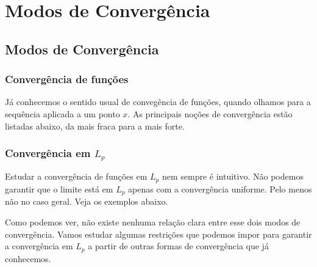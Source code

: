 







\chapter{Modos de Convergência}

\section{Modos de Convergência}

\subsection{Convergência de funções}

Já conhecemos o sentido usual de convegência de funções, quando olhamos para a sequência aplicada a um ponto $x$. As principais noções de convergência estão listadas abaixo, da mais fraca para a mais forte.

\aeConvergence
\pointwiseConvergence
\uniformConvergence

\subsection{Convergência em \texorpdfstring{$L_p$}{Lp}}

\LpConvergence

Estudar a convergência de funções em $L_p$ nem sempre é intuitivo. Não podemos garantir que o limite está em $L_p$ apenas com a convergência uniforme. Pelo menos não no caso geral. Veja os exemplos abaixo.

\counterExampleUniformConvergence

\counterExamplePointwiseConvergence

\counterExampleAEConvergence

\counterExampleLpConvergence

Como podemos ver, não existe nenhuma relação clara entre esse dois modos de convergência. Vamos estudar algumas restrições que podemos impor para garantir a convergência em $L_p$ a partir de outras formas de convergência que já conhecemos.

\uniformConvergenceLp

